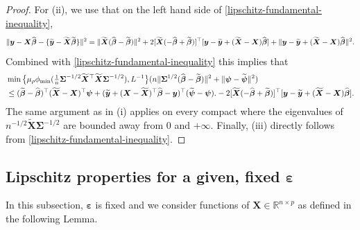 \documentclass[11pt]{amsart}
\numberwithin{equation}{section}
\numberwithin{equation}{section}
\def\real{{\mathbb{R}}}
\def\R{{\real}}
\def\mathbold{\boldsymbol} %
\def\bX{\mathbold{X}}\def\hbX{{\widehat{\bX}}}\def\tbX{{\widetilde{\bX}}}\def\bXbar{{\overline \bX}}
\def\by{\mathbold{y}}\def\yhat{\widehat{y}}\def\ytil{\widetilde{y}}\def\ybar{{\overline y}}\def\vby{{\bf y}}
\def\bbeta{\mathbold{\beta}}\def\betahat{\widehat{\beta}}\def\hbeta{\widehat{\beta}}
\def\hbbeta{{{\widehat{\bbeta}}}}
\def\tbbeta{\widetilde{\bbeta}}
\def\ep{\varepsilon}\def\eps{\epsilon}\def\veps{\varepsilon}
\def\bep{ {\mathbold{\ep} }}
\def\bSigma{\mathbold{\Sigma}}\def\hbSigma{{\widehat{\bSigma}}}
\def\bpsi{\mathbold{\psi}}\def\psihat{\widehat{\psi}}\def\hpsi{\widehat{\psi}}
\begin{document}
\begin{proof}
For (ii), we use that on the left hand side of \eqref{lipschitz-fundamental-inequality},
\begin{equation*}
\|\by-\bX\hbbeta - \{\tby-\tbX\tbbeta\}\|^2
=
\|\tbX(\hbbeta-\tbbeta)\|^2
+ 2[\tbX(-\hbbeta+\tbbeta)]^\top[\by-\tby+(\tbX-\bX)\hbbeta]
+
\|\by-\tby+(\tbX-\bX)\hbbeta\|^2.
\end{equation*}
Combined with \eqref{lipschitz-fundamental-inequality} this implies that
\begin{align*}
    &\min\big\{\mu_\rho\phi_{\min}(\tfrac 1 n \bSigma^{-1/2}\tbX{}^\top\tbX\bSigma^{-1/2}), L^{-1}\big\}
    (n\|\bSigma^{1/2}(\hbbeta-\tbbeta)\|^2 +  \|\bpsi-\tbpsi\|^2)
    \\&\le
    (\tbbeta -\hbbeta)^\top(\tbX-\bX)^\top\bpsi
    +
    (\tby + (\bX-\tbX)^\top\hbbeta -\by)^\top(\tbpsi - \bpsi).
     - 2[\tbX(-\hbbeta+\tbbeta)]^\top[\by-\tby+(\tbX-\bX)\hbbeta].
\end{align*}
The same argument as in (i) applies on every compact where the eigenvalues
of $n^{-1/2} \tbX\bSigma^{-1/2}$ are bounded away from $0$ and $+\infty$.
Finally,
(iii) directly follows from \eqref{lipschitz-fundamental-inequality}.
\end{proof}


\subsection{Lipschitz properties for a given, fixed \texorpdfstring{$\bep$}{epsilon}}

In this subsection, $\bep$ is fixed and we consider functions of $\bX\in\R^{n\times p}$
as defined in the following Lemma.
\end{document}

